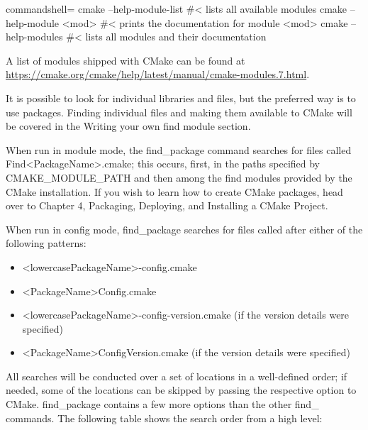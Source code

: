 \begin{tcblisting}{commandshell={}}
cmake --help-module-list #< lists all available modules
cmake --help-module <mod> #< prints the documentation for
  module
  <mod>
cmake --help-modules #< lists all modules and their
  documentation
\end{tcblisting}

A list of modules shipped with CMake can be found at \url{https://cmake.org/cmake/help/latest/manual/cmake-modules.7.html}.

\begin{tcolorbox}[colback=blue!5!white,colframe=blue!75!black,title=Finding Individual Libraries and Files]
It is possible to look for individual libraries and files, but the preferred way is to use packages. Finding individual files and making them available to CMake will be covered in the Writing your own find module section.
\end{tcolorbox}

When run in module mode, the find\_package command searches for files called Find<PackageName>.cmake; this occurs, first, in the paths specified by CMAKE\_MODULE\_PATH and then among the find modules provided by the CMake installation. If you wish to learn how to create CMake packages, head over to Chapter 4, Packaging, Deploying, and Installing a CMake Project.

When run in config mode, find\_package searches for files called after either of the following patterns:

\begin{itemize}
\item 
<lowercasePackageName>-config.cmake

\item 
<PackageName>Config.cmake

\item 
<lowercasePackageName>-config-version.cmake (if the version details were specified)

\item 
<PackageName>ConfigVersion.cmake (if the version details were specified)
\end{itemize}

All searches will be conducted over a set of locations in a well-defined order; if needed, some of the locations can be skipped by passing the respective option to CMake. find\_package contains a few more options than the other find\_ commands. The following table shows the search order from a high level:

